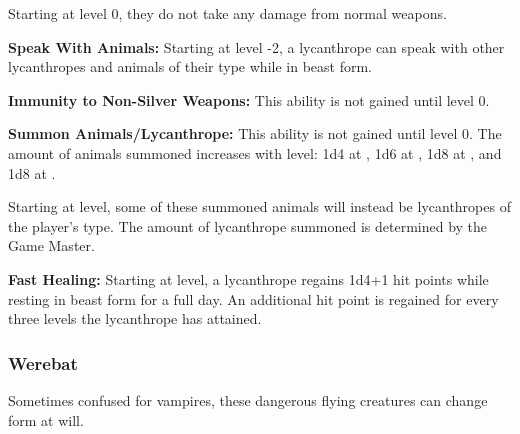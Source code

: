 \begin{multicols*}{2}
Starting at level 0, they do not take any damage from normal weapons.

\textbf{Speak With Animals:} Starting at level -2, a lycanthrope can speak with other lycanthropes and animals of their type while in beast form.

\textbf{Immunity to Non-Silver Weapons:} This ability is not gained until level 0.

\textbf{Summon Animals/Lycanthrope:} This ability is not gained until level 0. The amount of animals summoned increases with level: 1d4 at , 1d6 at , 1d8 at , and 1d8 at .

Starting at  level, some of these summoned animals will instead be lycanthropes of the player's type. The amount of lycanthrope summoned is determined by the Game Master.

\textbf{Fast Healing:} Starting at  level, a lycanthrope regains 1d4+1 hit points while resting in beast form for a full day. An additional hit point is regained for every three levels the lycanthrope has attained.

\subsubsection{Werebat}

Sometimes confused for vampires, these dangerous flying creatures can change form at will.


\end{multicols*}
